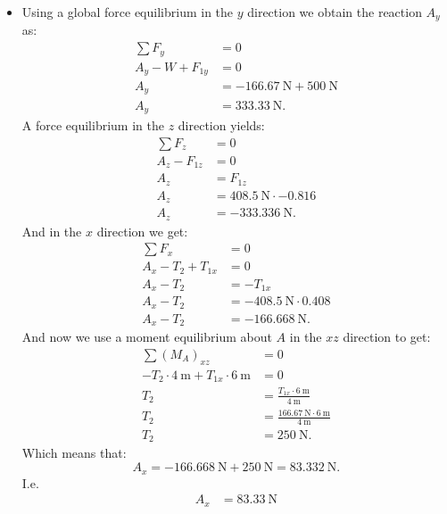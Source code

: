 \begin{derivation}
\begin{itemize}
\begin{equation*}
      .\end{equation*}
    \item[Q1.4]  Using a global force equilibrium in the $y$ direction we obtain the reaction $A_y$ as:
      \begin{align*}
        \sum F_y &= 0 \\
        A_y - W + F_{1y} &= 0 \\
        A_y &= -\qty{166,67}{\N} + \qty{500}{\N}  \\
        A_y &=  \qty{333,33}{\N} 
      .\end{align*}
      A force equilibrium in the $z$ direction yields:
      \begin{align*}
        \sum F_z &= 0 \\
        A_z - F_{1z} &= 0 \\
        A_z &= F_{1z} \\
        A_z &= \qty{408,5}{\N} \cdot \num{-0,816}  \\
        A_z &= \qty{-333,336}{\N} 
      .\end{align*}
      And in the $x$ direction we get:
      \begin{align*}
        \sum F_x &= 0 \\
        A_x - T_2 + T_{1x} &= 0 \\
        A_x - T_2 &= - T_{1x} \\
        A_x - T_2 &= - \qty{408.5}{\N} \cdot \num{0,408} \\
        A_x - T_2 &= - \qty{166,668}{\N} 
      .\end{align*}
      And now we use a moment equilibrium about $A$ in the $xz$ direction to get:
      \begin{align*}
        \sum \left( M_A \right)_{xz} &= 0 \\
        - T_2 \cdot \qty{4}{\m} + T_{1x} \cdot \qty{6}{\m} &= 0 \\
        T_2 &= \frac{T_{1x} \cdot \qty{6}{\m} }{\qty{4}{\m} } \\
        T_2 &= \frac{\qty{166,67}{\N} \cdot \qty{6}{\m} }{\qty{4}{\m} } \\
        T_2 &= \qty{250}{\N} 
      .\end{align*}
      Which means that:
      \begin{equation*}
        A_x = - \qty{166,668}{\N} + \qty{250}{\N} = \qty{83,332}{\N} 
      .\end{equation*}
      I.e.
      \begin{align*}
        A_x &= \qty{83,33}{\N}  \\

\end{align*}
\end{itemize}
\end{derivation}
